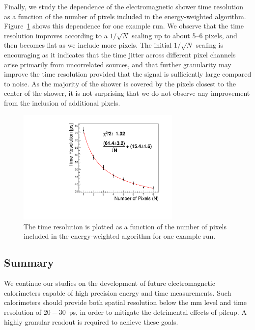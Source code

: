 Finally, we study the dependence of the electromagnetic shower time resolution
as a function of the number of pixels included in the energy-weighted algorithm.
Figure~\ref{fig:sqrtN} shows this dependence for one example run. We observe
that the time resolution improves according to a $1/\sqrt{N}$ scaling up to
about 5--6 pixels, and then becomes flat as we include more pixels. The
initial $1/\sqrt{N}$ scaling is encouraging as it indicates that the time jitter across
different pixel channels arise primarily from uncorrelated sources, and that
further granularity may improve the time resolution provided that the signal is
sufficiently large compared to noise. As the majority of the shower is
covered by the pixels closest to the center of the shower, it is not surprising
that we do not observe any improvement from the inclusion of additional pixels.

\begin{figure}[htbp]
  \centering
  \includegraphics[width=8cm]{Images/sqrtN/t1065_run_38_Dt_IWP.pdf}
  \caption{ The time resolution is plotted as a function of the number of pixels
    included in the energy-weighted algorithm for one example run. }
  \label{fig:sqrtN}
\end{figure}

\subsection{Summary}
We continue our studies on the development of future electromagnetic 
calorimeters capable of high precision energy and time measurements.
Such calorimeters should provide both spatial resolution below the $\mathrm{mm}$
level and time resolution of $20-30$~ps, in order to mitigate the detrimental effects
of pileup. A highly granular readout is required to achieve these goals. 

